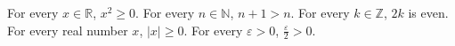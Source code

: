 For every $x \in \mathbb{R}$, $x^{2} \geq 0$.
For every $n \in \mathbb{N}$, $n + 1 > n$.
For every $k \in \mathbb{Z}$, $2k$ is even.
For every real number $x$, $\lvert x \rvert \geq 0$.
For every $\varepsilon > 0$, $\frac{\varepsilon}{2} > 0$.